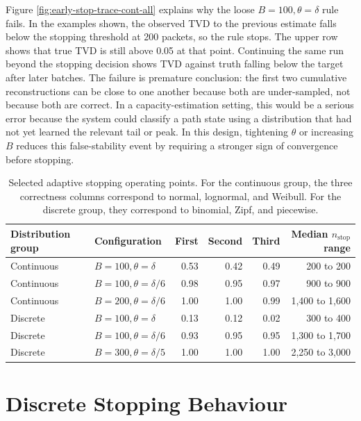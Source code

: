 \documentclass[a4paper,11pt]{report}
\begin{document}
Figure \ref{fig:early-stop-trace-cont-all} explains why the loose \(B=100,\theta=\delta\) rule fails. In the examples shown, the observed TVD to the previous estimate falls below the stopping threshold at 200 packets, so the rule stops. The upper row shows that true TVD is still above 0.05 at that point. Continuing the same run beyond the stopping decision shows TVD against truth falling below the target after later batches. The failure is premature conclusion: the first two cumulative reconstructions can be close to one another because both are under-sampled, not because both are correct. In a capacity-estimation setting, this would be a serious error because the system could classify a path state using a distribution that had not yet learned the relevant tail or peak. In this design, tightening \(\theta\) or increasing \(B\) reduces this false-stability event by requiring a stronger sign of convergence before stopping.

\begin{table}[htbp]
\centering
\small
\begin{tabular}{llrrrr}
\toprule
Distribution group & Configuration & First & Second & Third & Median \(n_{\mathrm{stop}}\) range \\
\midrule
Continuous & \(B=100,\theta=\delta\) & 0.53 & 0.42 & 0.49 & 200 to 200 \\
Continuous & \(B=100,\theta=\delta/6\) & 0.98 & 0.95 & 0.97 & 900 to 900 \\
Continuous & \(B=200,\theta=\delta/6\) & 1.00 & 1.00 & 0.99 & 1,400 to 1,600 \\
Discrete & \(B=100,\theta=\delta\) & 0.13 & 0.12 & 0.02 & 300 to 400 \\
Discrete & \(B=100,\theta=\delta/6\) & 0.93 & 0.95 & 0.95 & 1,300 to 1,700 \\
Discrete & \(B=300,\theta=\delta/5\) & 1.00 & 1.00 & 1.00 & 2,250 to 3,000 \\
\bottomrule
\end{tabular}
\caption{Selected adaptive stopping operating points. For the continuous group, the three correctness columns correspond to normal, lognormal, and Weibull. For the discrete group, they correspond to binomial, Zipf, and piecewise.}
\label{tab:adaptive-operating-points}
\end{table}

\section{Discrete Stopping Behaviour}
\end{document}
